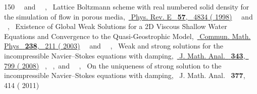 \documentclass[
prb,
twocolumn,
superscriptaddress,
 amsmath,amssymb,
 aps,
longbibliography,
]{revtex4-2}
\begin{document}
\begin{thebibliography}{150}
  \BibitemOpen
   { {~}\ and\  {~},\ } { {Lattice {Boltzmann} scheme with real numbered solid density for the simulation of flow in porous media},\ }\href {https://link.aps.org/doi/10.1103/PhysRevE.57.4834} { { {Phys. Rev. E}\ }\textbf { {57}},\  {4834} ( {1998})}
  \BibitemOpen
   { {~}\ and\  {~},\ } { {Existence of {Global} {Weak} {Solutions} for a {2D} {Viscous} {Shallow} {Water} {Equations} and {Convergence} to the {Quasi}-{Geostrophic} {Model}},\ }\href {https://doi.org/10.1007/s00220-003-0859-8} { { {Commun. Math. Phys}\ }\textbf { {238}},\  {211} ( {2003})}
  \BibitemOpen
   { {~}\ and\  {~},\ } { {Weak and strong solutions for the incompressible {Navier}–{Stokes} equations with damping},\ }\href {https://www.sciencedirect.com/science/article/pii/S0022247X08000553} { { {J. Math. Anal.}\ }\textbf { {343}},\  {799} ( {2008})}
  \BibitemOpen
   { {~},  {~},\ and\  {~},\ } { {On the uniqueness of strong solution to the incompressible {Navier}--{Stokes} equations with damping},\ }\href@noop {} { { {J. Math. Anal.}\ }\textbf { {377}},\  {414} ( {2011})}

\end{thebibliography}
\end{document}
